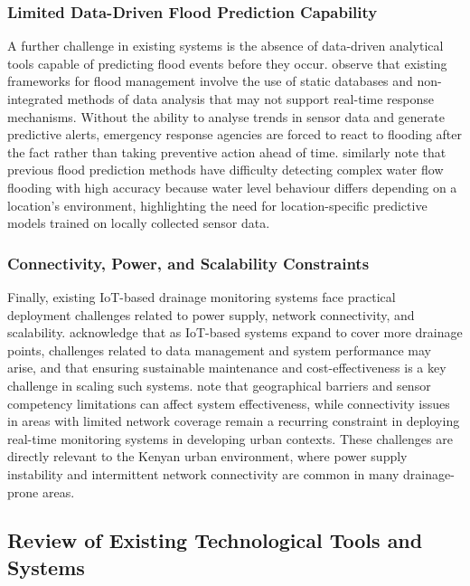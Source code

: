 \documentclass[12pt, a4paper]{article}
\begin{document}
\subsubsection{Limited Data-Driven Flood Prediction Capability}

A further challenge in existing systems is the absence of data-driven analytical tools capable of predicting flood events before they occur. \citet{sathiyamoorthy2025} observe that existing frameworks for flood management involve the use of static databases and non-integrated methods of data analysis that may not support real-time response mechanisms. Without the ability to analyse trends in sensor data and generate predictive alerts, emergency response agencies are forced to react to flooding after the fact rather than taking preventive action ahead of time. \citet{hiroi2016} similarly note that previous flood prediction methods have difficulty detecting complex water flow flooding with high accuracy because water level behaviour differs depending on a location's environment, highlighting the need for location-specific predictive models trained on locally collected sensor data.

\subsubsection{Connectivity, Power, and Scalability Constraints}

Finally, existing IoT-based drainage monitoring systems face practical deployment challenges related to power supply, network connectivity, and scalability. \citet{nageye2025} acknowledge that as IoT-based systems expand to cover more drainage points, challenges related to data management and system performance may arise, and that ensuring sustainable maintenance and cost-effectiveness is a key challenge in scaling such systems. \citet{kumar2025} note that geographical barriers and sensor competency limitations can affect system effectiveness, while connectivity issues in areas with limited network coverage remain a recurring constraint in deploying real-time monitoring systems in developing urban contexts. These challenges are directly relevant to the Kenyan urban environment, where power supply instability and intermittent network connectivity are common in many drainage-prone areas.

\subsection{Review of Existing Technological Tools and Systems}
\end{document}

